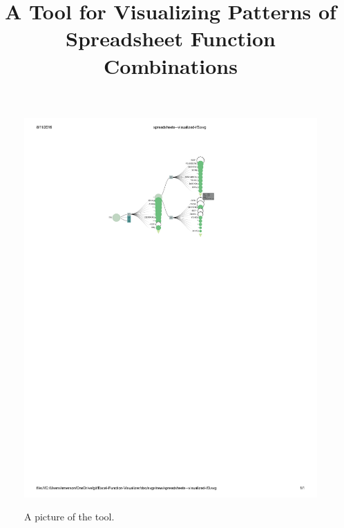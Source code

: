\documentclass[conference]{IEEEtran}
\begin{document}
	\title{A Tool for Visualizing Patterns of Spreadsheet Function Combinations}
	
	
	\author{ 
		 }
	
	
	\maketitle
	
	\begin{figure}[t] \includegraphics[width = \textwidth]{IFargslabel} \caption{A
			picture of the tool.} \centering \label{fig:fullpic} \end{figure}
	
\end{document}

